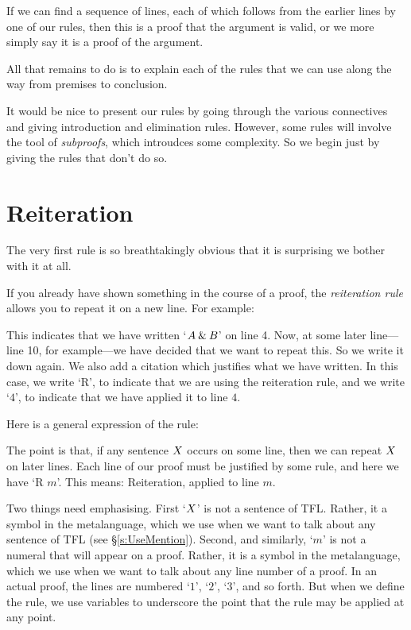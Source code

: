 If we can find a sequence of lines, each of which follows from the earlier lines by one of our rules, then this is a proof that the argument is valid, or we more simply say it is a proof of the argument. 

All that remains to do is to explain each of the rules that we can use along the way from premises to conclusion. 

It would be nice to present our rules by going through the various connectives and giving introduction and elimination rules. However, some rules will involve the tool of \emph{subproofs}, which introudces some complexity. So we begin just by giving the rules that don't do so. 

\section{Reiteration}\label{s:Reiteration}
The very first rule is so breathtakingly obvious that it is surprising we bother with it at all. 

If you already have shown something in the course of a proof, the \emph{reiteration rule} allows you to repeat it on a new line. For example:
\begin{pf}
	\have[$\vdots$]{}{\vdots}
	 
\end{pf}
This indicates that we have written `$A \mathbin{\&} B$' on line 4. Now, at some later line---line 10, for example---we have decided that we want to repeat this. So we write it down again. We also add a citation which justifies what we have written. In this case, we write `R', to indicate that we are using the reiteration rule, and we write `$4$', to indicate that we have applied it to line $4$.

Here is a general expression of the rule:
\begin{highlighted}
\begin{pf}
	\ellipsesline
	\ellipsesline
	 
\end{pf}
\end{highlighted}
The point is that, if any sentence $X$ occurs on some line, then we can repeat $X$ on later lines. Each line of our proof must be justified by some rule, and here we have `R $m$'. This means: Reiteration, applied to line $m$. 

Two things need emphasising. First `$X$' is not a sentence of TFL. Rather, it a symbol in the metalanguage, which we use when we want to talk about any sentence of TFL (see \S\ref{s:UseMention}). Second, and similarly, `$m$' is not a numeral that will appear on a proof. Rather, it is a symbol in the metalanguage, which we use when we want to talk about any line number of a proof. In an actual proof, the lines are numbered `$1$', `$2$', `$3$', and so forth. But when we define the rule, we use variables to underscore the point that the rule may be applied at any point.

